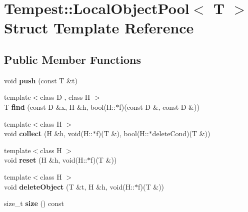 \hypertarget{struct_tempest_1_1_local_object_pool}{\section{Tempest\+:\+:Local\+Object\+Pool$<$ T $>$ Struct Template Reference}
\label{struct_tempest_1_1_local_object_pool}
}
\subsection*{Public Member Functions}
\begin{DoxyCompactItemize}
\item 
\hypertarget{struct_tempest_1_1_local_object_pool_a0b5268a404a26369995a1fc4c5854f0d}{void {\bfseries push} (const T \&t)}\label{struct_tempest_1_1_local_object_pool_a0b5268a404a26369995a1fc4c5854f0d}

\item 
\hypertarget{struct_tempest_1_1_local_object_pool_a363032b3e443e23b1c94abb40f235cc9}{{\footnotesize template$<$class D , class H $>$ }\\T {\bfseries find} (const D \&x, H \&h, bool(H\+::$\ast$f)(const D \&, const D \&))}\label{struct_tempest_1_1_local_object_pool_a363032b3e443e23b1c94abb40f235cc9}

\item 
\hypertarget{struct_tempest_1_1_local_object_pool_a46b6e648c635ad2bdaf583320eb70580}{{\footnotesize template$<$class H $>$ }\\void {\bfseries collect} (H \&h, void(H\+::$\ast$f)(T \&), bool(H\+::$\ast$delete\+Cond)(T \&))}\label{struct_tempest_1_1_local_object_pool_a46b6e648c635ad2bdaf583320eb70580}

\item 
\hypertarget{struct_tempest_1_1_local_object_pool_a634f468ff129b248d54110c90df1d182}{{\footnotesize template$<$class H $>$ }\\void {\bfseries reset} (H \&h, void(H\+::$\ast$f)(T \&))}\label{struct_tempest_1_1_local_object_pool_a634f468ff129b248d54110c90df1d182}

\item 
\hypertarget{struct_tempest_1_1_local_object_pool_ae741384b5203be69c6aefbdd20db7592}{{\footnotesize template$<$class H $>$ }\\void {\bfseries delete\+Object} (T \&t, H \&h, void(H\+::$\ast$f)(T \&))}\label{struct_tempest_1_1_local_object_pool_ae741384b5203be69c6aefbdd20db7592}

\item 
\hypertarget{struct_tempest_1_1_local_object_pool_a8f6e4934b6ca9bc3ad6e6d58a9176701}{size\+\_\+t {\bfseries size} () const }\label{struct_tempest_1_1_local_object_pool_a8f6e4934b6ca9bc3ad6e6d58a9176701}

\end{DoxyCompactItemize}

